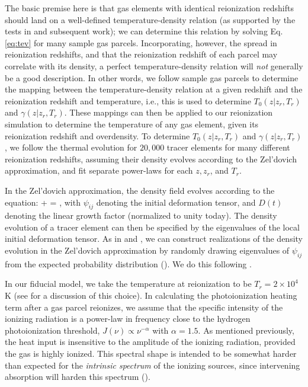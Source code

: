 The basic premise here is that gas elements with identical reionization redshifts should land on a well-defined temperature-density
relation (as supported by the tests in \citealt{Hui:1997dp} and subsequent work); we can determine this relation by solving Eq. \ref{eq:tev} for many sample gas parcels.
Incorporating, however, the spread in reionization redshifts, and that the reionization redshift of each parcel may
correlate with its density, a perfect temperature-density relation will {\em not} generally be a good description. In other words,
we follow sample gas parcels to determine the mapping between the temperature-density relation at a given redshift and
the reionization redshift and temperature, i.e., this is used to determine $T_0(z|z_r,T_r)$ and $\gamma(z|z_r, T_r)$. These
mappings can then be applied to our reionization simulation to determine the temperature of any gas element, given its
reionization redshift and overdensity. To determine $T_0(z|z_r,T_r)$ and $\gamma(z|z_r,T_r)$, we follow the thermal evolution for $20,000$ tracer elements
for many different
reionization redshifts, assuming their density evolves according to the Zel'dovich approximation, and fit separate power-laws
for each $z, z_r$, and $T_r$. 

In the Zel'dovich approximation, the density field evolves according to the equation:
 + \delta = ,
\label{eq:zeldo}
\eeqa
with $\psi_{ij}$ denoting the initial deformation tensor, and $D(t)$ denoting the linear growth factor (normalized to unity today). The density evolution of a tracer element can then be specified by the eigenvalues of the local initial deformation 
tensor.  
As in \citet{Hui:1997dp} and \citet{1995ApJ...449..476R}, we can construct realizations of the density evolution in the Zel'dovich approximation 
by randomly drawing eigenvalues of $\psi_{ij}$ from the expected probability distribution (\citealt{1970Afz.....6..581D}). We do this following \citet{Hui:1999ku,Bertschinger:1993zv}. 


In our fiducial model, we take the temperature at reionization to be $T_r = 2 \times 10^4$ K (see \citealt{Furlanetto:2009kr,McQuinn:2012bq} for a discussion
of this choice). In calculating the photoionization heating term after a gas parcel reionizes, we assume that the specific
intensity of the ionizing radiation 
is a power-law in frequency close to the hydrogen photoionization threshold, $J(\nu) \propto \nu^{-\alpha}$ with $\alpha=1.5$.
As mentioned previously, the heat input is insensitive to the amplitude of the ionizing radiation, provided the gas is highly ionized. This spectral shape is intended
to be somewhat harder than expected for the {\em intrinsic spectrum} of the ionizing sources, since intervening absorption will harden
this spectrum (\citealt{1993ApJ...418...28Z,Hui:2003hn,Furlanetto:2009kr}).


